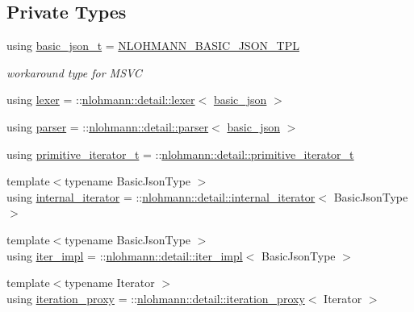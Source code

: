 \subsection*{Private Types}
\begin{DoxyCompactItemize}
\item 
using \hyperlink{classnlohmann_1_1basic__json_afff7860310ae69f29f8158a77ec0ef13}{basic\+\_\+json\+\_\+t} = \hyperlink{macro__scope_8hpp_a80b7254e63f199a1f656f07ae551f632}{N\+L\+O\+H\+M\+A\+N\+N\+\_\+\+B\+A\+S\+I\+C\+\_\+\+J\+S\+O\+N\+\_\+\+T\+PL}
\begin{DoxyCompactList}\small\item\em workaround type for M\+S\+VC \end{DoxyCompactList}\item 
using \hyperlink{classnlohmann_1_1basic__json_a163540181fa07868de2902ecdb6df2ae}{lexer} = \+::\hyperlink{classnlohmann_1_1detail_1_1lexer}{nlohmann\+::detail\+::lexer}$<$ \hyperlink{classnlohmann_1_1basic__json}{basic\+\_\+json} $>$
\item 
using \hyperlink{classnlohmann_1_1basic__json_aba9704e82d18f8954f9925e26cec7a51}{parser} = \+::\hyperlink{classnlohmann_1_1detail_1_1parser}{nlohmann\+::detail\+::parser}$<$ \hyperlink{classnlohmann_1_1basic__json}{basic\+\_\+json} $>$
\item 
using \hyperlink{classnlohmann_1_1basic__json_a2b38de408edf89649e8bd3abcfdff038}{primitive\+\_\+iterator\+\_\+t} = \+::\hyperlink{classnlohmann_1_1detail_1_1primitive__iterator__t}{nlohmann\+::detail\+::primitive\+\_\+iterator\+\_\+t}
\item 
{\footnotesize template$<$typename Basic\+Json\+Type $>$ }\\using \hyperlink{classnlohmann_1_1basic__json_a3ce72c6254981a9d378ece3c9b15e96b}{internal\+\_\+iterator} = \+::\hyperlink{structnlohmann_1_1detail_1_1internal__iterator}{nlohmann\+::detail\+::internal\+\_\+iterator}$<$ Basic\+Json\+Type $>$
\item 
{\footnotesize template$<$typename Basic\+Json\+Type $>$ }\\using \hyperlink{classnlohmann_1_1basic__json_abfd677a136936c16adf01e335f6a7a72}{iter\+\_\+impl} = \+::\hyperlink{classnlohmann_1_1detail_1_1iter__impl}{nlohmann\+::detail\+::iter\+\_\+impl}$<$ Basic\+Json\+Type $>$
\item 
{\footnotesize template$<$typename Iterator $>$ }\\using \hyperlink{classnlohmann_1_1basic__json_afb49d897bc58d6678f4471925bbfbb01}{iteration\+\_\+proxy} = \+::\hyperlink{classnlohmann_1_1detail_1_1iteration__proxy}{nlohmann\+::detail\+::iteration\+\_\+proxy}$<$ Iterator $>$

\end{DoxyCompactItemize}
